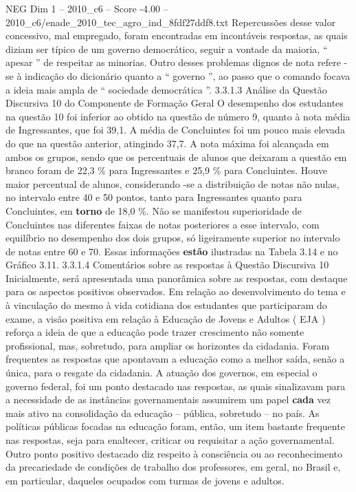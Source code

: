 \begin{textsample}{NEG Dim 1 – 2010\_c6 – Score -4.00 – 2010\_c6/enade\_2010\_tec\_agro\_ind\_8fdf27ddf8.txt}
Repercussões desse valor concessivo, mal empregado, foram encontradas em incontáveis respostas, as quais diziam ser típico de um governo democrático, seguir a vontade da maioria, “ apesar ” de respeitar as minorias.
Outro desses problemas dignos de nota refere -se à indicação do dicionário quanto a “ governo ”, ao passo que o comando focava a ideia mais ampla de “ sociedade democrática ”. 3.3.1.3 Análise da Questão Discursiva 10 do Componente de Formação Geral O desempenho dos estudantes na questão 10 foi inferior ao obtido na questão de número 9, quanto à nota média de Ingressantes, que foi 39,1.
A média de Concluintes foi um pouco mais elevada do que na questão anterior, atingindo 37,7.
A nota máxima foi alcançada em ambos os grupos, sendo que os percentuais de alunos que deixaram a questão em branco foram de 22,3 \% para Ingressantes e 25,9 \% para Concluintes.
Houve maior percentual de alunos, considerando -se a distribuição de notas não nulas, no intervalo entre 40 e 50 pontos, tanto para Ingressantes quanto para Concluintes, em \textbf{torno} de 18,0 \%.
Não se manifestou superioridade de Concluintes nas diferentes faixas de notas posteriores a esse intervalo, com equilíbrio no desempenho dos dois grupos, só ligeiramente superior no intervalo de notas entre 60 e 70.
Essas informações \textbf{estão} ilustradas na Tabela 3.14 e no Gráfico 3.11. 3.3.1.4 Comentários sobre as respostas à Questão Discursiva 10 Inicialmente, será apresentada uma panorâmica sobre as respostas, com destaque para os aspectos positivos observados.
Em relação ao desenvolvimento do tema e à vinculação do mesmo à vida cotidiana dos estudantes que participaram do exame, a visão positiva em relação à Educação de Jovens e Adultos ( EJA ) reforça a ideia de que a educação pode trazer crescimento não somente profissional, mas, sobretudo, para ampliar os horizontes da cidadania.
Foram frequentes as respostas que apontavam a educação como a melhor saída, senão a única, para o resgate da cidadania.
A atuação dos governos, em especial o governo federal, foi um ponto destacado nas respostas, as quais sinalizavam para a necessidade de as instâncias governamentais assumirem um papel \textbf{cada} vez mais ativo na consolidação da educação – pública, sobretudo – no país.
As políticas públicas focadas na educação foram, então, um item bastante frequente nas respostas, seja para enaltecer, criticar ou requisitar a ação governamental.
Outro ponto positivo destacado diz respeito à consciência ou ao reconhecimento da precariedade de condições de trabalho dos professores, em geral, no Brasil e, em particular, daqueles ocupados com turmas de jovens e adultos.

\end{textsample}
